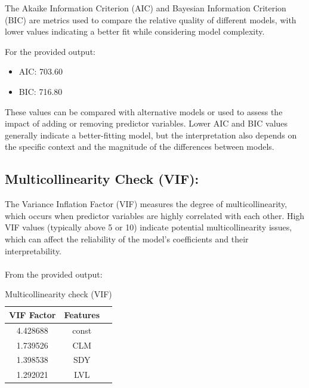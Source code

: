 \documentclass{article}
\begin{document}
The Akaike Information Criterion (AIC) and Bayesian Information Criterion (BIC) are metrics used to compare the relative quality of different models, with lower values indicating a better fit while considering model complexity.

For the provided output:
\begin{itemize}
    \item AIC: 703.60
    \item BIC: 716.80
\end{itemize}

\noindent These values can be compared with alternative models or used to assess the impact of adding or removing predictor variables. Lower AIC and BIC values generally indicate a better-fitting model, but the interpretation also depends on the specific context and the magnitude of the differences between models.

\subsection*{Multicollinearity Check (VIF):}

The Variance Inflation Factor (VIF) measures the degree of multicollinearity, which occurs when predictor variables are highly correlated with each other. High VIF values (typically above 5 or 10) indicate potential multicollinearity issues, which can affect the reliability of the model's coefficients and their interpretability.
\\\\
From the provided output:

\begin{table}[H]
  \centering
  \caption{Multicollinearity check (VIF)}
    \begin{tabular}{ccc}
    \toprule
    \textbf{VIF Factor} & \textbf{Features} \\
    \midrule
    4.428688 & const \\
    1.739526 & CLM \\
    1.398538 & SDY \\
    1.292021 & LVL \\
    \bottomrule
    \end{tabular}%
  \label{tab:vif}%
\end{table}%
\end{document}
